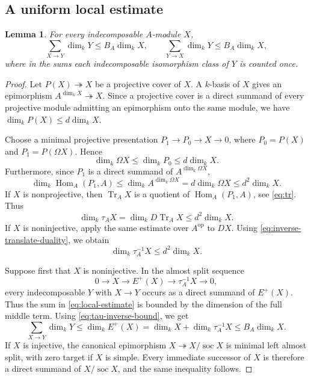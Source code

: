 \documentclass[11pt,letterpaper,reqno]{amsart}
\newtheorem{lemma}[lemma]{Lemma}
\theoremstyle{definition}
\DeclareMathOperator{\Hom}{Hom}
\DeclareMathOperator{\soc}{soc}
\DeclareMathOperator{\Tr}{Tr}
\newcommand{\op}{\mathrm{op}}
\begin{document}
\subsection{A uniform local estimate}\label{subsec:local-estimate}

\begin{lemma}\label{lem:local-estimate}
For every indecomposable $A$-module $X$,
\begin{equation}\label{eq:local-estimate}
\sum_{X\longrightarrow Y}\dim_kY\leq B_A\dim_kX,
\qquad
\sum_{Y\longrightarrow X}\dim_kY\leq B_A\dim_kX,
\end{equation}
where in the sums each indecomposable isomorphism class of $Y$ is counted once.
\end{lemma}

\begin{proof}
Let $P(X)\twoheadrightarrow X$ be a projective cover of $X$.  A $k$-basis of $X$ gives an epimorphism
$A^{\dim_kX}\twoheadrightarrow X$.  Since a projective cover is a direct
summand of every projective module admitting an epimorphism onto the same
module, we have $\dim_kP(X)\leq d\dim_kX$.



Choose a minimal projective presentation $P_1\longrightarrow P_0\longrightarrow X\longrightarrow0$, where $P_0=P(X)$ and $P_1=P(\Omega X)$.  Hence
\[
\dim_k\Omega X\leq\dim_kP_0\leq d\dim_kX.
\]
Furthermore, since $P_1$ is a direct
summand of $A^{\dim_k\Omega X}$,
\[
\dim_k\Hom_A(P_1,A)\leq\dim_kA^{\dim_k\Omega X}
 = d\dim_k\Omega X
 \leq d^2\dim_kX.
\]
If $X$ is nonprojective, then $\Tr_AX$ is a quotient of
$\Hom_A(P_1,A)$, see \eqref{eq:tr}.  Thus
\begin{equation}\label{eq:tau-bound}
\dim_k\tau_AX
 =\dim_kD\Tr_AX
 \leq d^2\dim_kX.
\end{equation}
If $X$ is noninjective, apply the same estimate over $A^{\op}$ to $DX$.
Using \eqref{eq:inverse-translate-duality}, we obtain
\begin{equation}\label{eq:tau-inverse-bound}
\dim_k\tau_A^{-1}X\leq d^2\dim_kX.
\end{equation}

Suppose first that $X$ is noninjective.  In the almost split sequence
\[
0\longrightarrow X\longrightarrow E^+(X)
\longrightarrow\tau_A^{-1}X\longrightarrow0,
\]
every indecomposable $Y$ with $X\longrightarrow Y$ occurs as a direct
summand of $E^+(X)$. Thus the sum in \eqref{eq:local-estimate} is bounded by the dimension of the full middle term.
Using \eqref{eq:tau-inverse-bound}, we get
\[
\sum_{X\longrightarrow Y}\dim_kY
 \leq\dim_kE^+(X)
 =\dim_kX+\dim_k\tau_A^{-1}X
 \leq B_A\dim_kX.
\]
If $X$ is injective, the canonical epimorphism
$X\twoheadrightarrow X/\soc X$ is minimal left almost split, with zero
target if $X$ is simple.  Every immediate successor of $X$ is therefore a
direct summand of $X/\soc X$, and the same inequality follows.


\end{proof}
\end{document}
